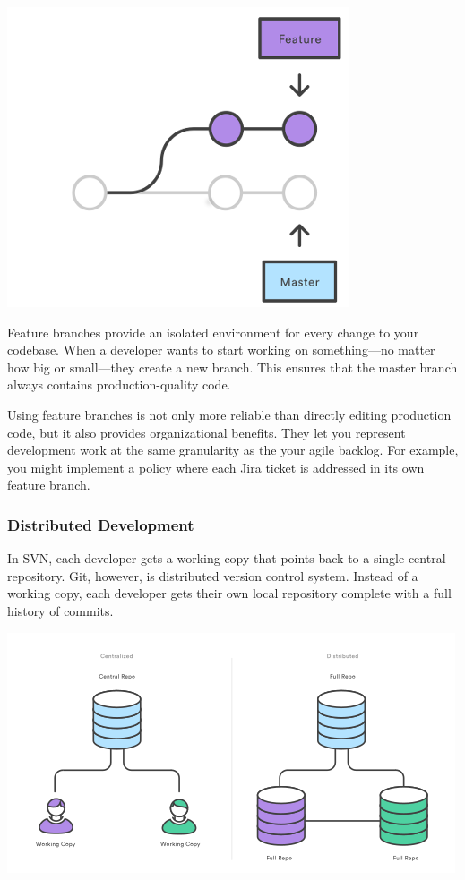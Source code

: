 \documentclass[11pt]{article}
\begin{document}
\includegraphics[width=.9\linewidth]{./img/2.png}

Feature branches provide an isolated environment for every change to your codebase. When a developer wants to start working on something—no matter how big or small—they create a new branch. This ensures that the master branch always contains production-quality code.

Using feature branches is not only more reliable than directly editing production code, but it also provides organizational benefits. They let you represent development work at the same granularity as the your agile backlog. For example, you might implement a policy where each Jira ticket is addressed in its own feature branch.

\subsubsection{Distributed Development}
\label{sec-1-5-2}
In SVN, each developer gets a working copy that points back to a single central repository. Git, however, is  distributed version control system. Instead of a working copy, each developer gets their own local repository complete with a full history of commits.

\includegraphics[width=.9\linewidth]{./img/3.png}
\end{document}
